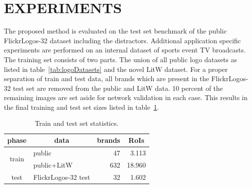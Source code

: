 \documentclass[a4paper,twoside]{article}
\begin{document}
\section{\uppercase{Experiments}}
%
\noindent The proposed method is evaluated on the test set benchmark of the public FlickrLogos-32 dataset including the distractors. Additional application specific experiments are performed on an internal dataset of sports event TV broadcasts. 
The training set consists of two parts. The union of all public logo datasets as listed in table~\ref{tab:logoDatasets} and the novel \ac{LitW} dataset. For a proper separation of train and test data, all brands which are present in the FlickrLogos-32 test set are removed from the public and \ac{LitW} data. 10 percent of the remaining images are set aside for network validation in each case. This results in the final training and test set sizes listed in table~\ref{tab:trainTestStatistics}.
%
\begin{table}[t]
\centering
\begingroup	
\setlength{\tabcolsep}{6pt}
\caption{Train and test set statistics.}
\label{tab:trainTestStatistics}
\begin{small}
\begin{tabular}{cl|rr}
\textbf{phase} & \multicolumn{1}{c|}{\textbf{data}} & \multicolumn{1}{c}{\textbf{brands}} & \multicolumn{1}{c}{\textbf{RoIs}} \bigstrut[b]\\
\hline
\multirow{2}[2]{*}{train} & public & 47    & 3.113 \bigstrut[t]\\
      & public+\ac{LitW} & 632   & 18.960 \bigstrut[b]\\
\hline
test  & FlickrLogos-32 test & 32    & 1.602 \bigstrut[t]\\
\end{tabular}%
\end{small}
\endgroup
\end{table}
\end{document}
